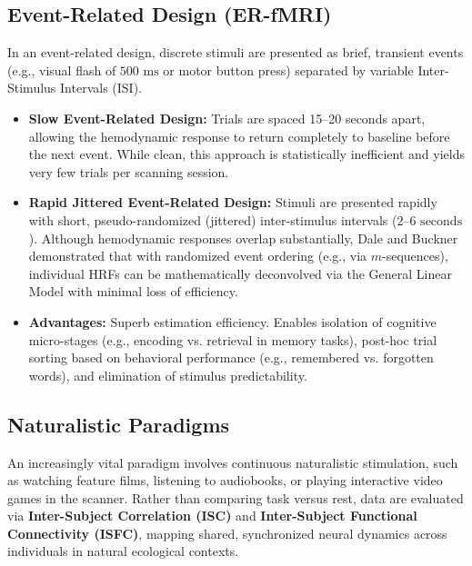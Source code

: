 \documentclass[11pt,a4paper]{article}
\begin{document}
\subsection{Event-Related Design (ER-fMRI)}
In an event-related design, discrete stimuli are presented as brief, transient events (e.g., visual flash of $500\text{ ms}$ or motor button press) separated by variable Inter-Stimulus Intervals ($\text{ISI}$).
\begin{itemize}[leftmargin=2em]
    \item \textbf{Slow Event-Related Design:} Trials are spaced 15--20 seconds apart, allowing the hemodynamic response to return completely to baseline before the next event. While clean, this approach is statistically inefficient and yields very few trials per scanning session.
    \item \textbf{Rapid Jittered Event-Related Design:} Stimuli are presented rapidly with short, pseudo-randomized (jittered) inter-stimulus intervals ($2\text{--}6\text{ seconds}$). Although hemodynamic responses overlap substantially, Dale and Buckner demonstrated that with randomized event ordering (e.g., via $m$-sequences), individual HRFs can be mathematically deconvolved via the General Linear Model with minimal loss of efficiency.
    \item \textbf{Advantages:} Superb estimation efficiency. Enables isolation of cognitive micro-stages (e.g., encoding vs. retrieval in memory tasks), post-hoc trial sorting based on behavioral performance (e.g., remembered vs. forgotten words), and elimination of stimulus predictability.
\end{itemize}

\subsection{Naturalistic Paradigms}
An increasingly vital paradigm involves continuous naturalistic stimulation, such as watching feature films, listening to audiobooks, or playing interactive video games in the scanner. Rather than comparing task versus rest, data are evaluated via \textbf{Inter-Subject Correlation (ISC)} and \textbf{Inter-Subject Functional Connectivity (ISFC)}, mapping shared, synchronized neural dynamics across individuals in natural ecological contexts.
\end{document}
